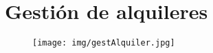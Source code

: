 \section{Gestión de alquileres}
\begin{figure}[!h]
  \centering
    \texttt{[image: img/gestAlquiler.jpg]}
    \caption{}
\end{figure}
